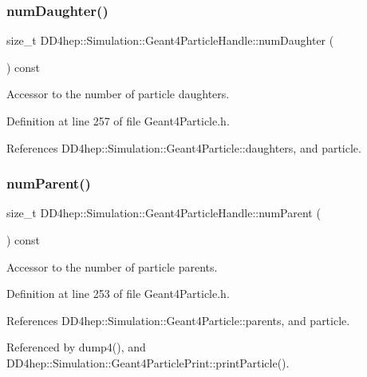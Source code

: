 \subsubsection{\texorpdfstring{num\+Daughter()}{numDaughter()}}
{\footnotesize\ttfamily size\+\_\+t D\+D4hep\+::\+Simulation\+::\+Geant4\+Particle\+Handle\+::num\+Daughter (\begin{DoxyParamCaption}{ }\end{DoxyParamCaption}) const\hspace{0.3cm}{\ttfamily [inline]}}



Accessor to the number of particle daughters. 



Definition at line 257 of file Geant4\+Particle.\+h.



References D\+D4hep\+::\+Simulation\+::\+Geant4\+Particle\+::daughters, and particle.

\hypertarget{class_d_d4hep_1_1_simulation_1_1_geant4_particle_handle_a1f7178a004a1eb673c9a4b7b9b2b7ab8}{}\label{class_d_d4hep_1_1_simulation_1_1_geant4_particle_handle_a1f7178a004a1eb673c9a4b7b9b2b7ab8} 
\subsubsection{\texorpdfstring{num\+Parent()}{numParent()}}
{\footnotesize\ttfamily size\+\_\+t D\+D4hep\+::\+Simulation\+::\+Geant4\+Particle\+Handle\+::num\+Parent (\begin{DoxyParamCaption}{ }\end{DoxyParamCaption}) const\hspace{0.3cm}{\ttfamily [inline]}}



Accessor to the number of particle parents. 



Definition at line 253 of file Geant4\+Particle.\+h.



References D\+D4hep\+::\+Simulation\+::\+Geant4\+Particle\+::parents, and particle.



Referenced by dump4(), and D\+D4hep\+::\+Simulation\+::\+Geant4\+Particle\+Print\+::print\+Particle().


